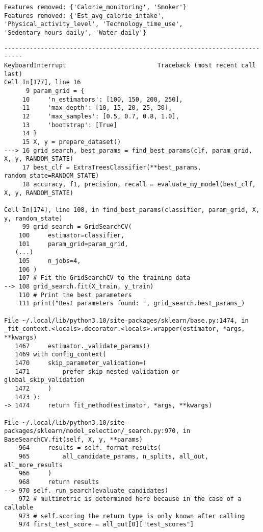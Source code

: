 \documentclass[
  english,
]{article}
\begin{document}
\begin{verbatim}
Features removed: {'Calorie_monitoring', 'Smoker'}
Features removed: {'Est_avg_calorie_intake', 'Physical_activity_level', 'Technology_time_use', 'Sedentary_hours_daily', 'Water_daily'}
\end{verbatim}

\begin{verbatim}
---------------------------------------------------------------------------
KeyboardInterrupt                         Traceback (most recent call last)
Cell In[177], line 16
      9 param_grid = {
     10     'n_estimators': [100, 150, 200, 250],
     11     'max_depth': [10, 15, 20, 25, 30],
     12     'max_samples': [0.5, 0.7, 0.8, 1.0],
     13     'bootstrap': [True]
     14 }
     15 X, y = prepare_dataset()
---> 16 grid_search, best_params = find_best_params(clf, param_grid, X, y, RANDOM_STATE)
     17 best_clf = ExtraTreesClassifier(**best_params, random_state=RANDOM_STATE)
     18 accuracy, f1, precision, recall = evaluate_my_model(best_clf, X, y, RANDOM_STATE)

Cell In[174], line 108, in find_best_params(classifier, param_grid, X, y, random_state)
     99 grid_search = GridSearchCV(
    100     estimator=classifier,
    101     param_grid=param_grid,
   (...)
    105     n_jobs=4,
    106 )
    107 # Fit the GridSearchCV to the training data
--> 108 grid_search.fit(X_train, y_train)
    110 # Print the best parameters
    111 print("Best parameters found: ", grid_search.best_params_)

File ~/.local/lib/python3.10/site-packages/sklearn/base.py:1474, in _fit_context.<locals>.decorator.<locals>.wrapper(estimator, *args, **kwargs)
   1467     estimator._validate_params()
   1469 with config_context(
   1470     skip_parameter_validation=(
   1471         prefer_skip_nested_validation or global_skip_validation
   1472     )
   1473 ):
-> 1474     return fit_method(estimator, *args, **kwargs)

File ~/.local/lib/python3.10/site-packages/sklearn/model_selection/_search.py:970, in BaseSearchCV.fit(self, X, y, **params)
    964     results = self._format_results(
    965         all_candidate_params, n_splits, all_out, all_more_results
    966     )
    968     return results
--> 970 self._run_search(evaluate_candidates)
    972 # multimetric is determined here because in the case of a callable
    973 # self.scoring the return type is only known after calling
    974 first_test_score = all_out[0]["test_scores"]


\end{verbatim}
\end{document}
